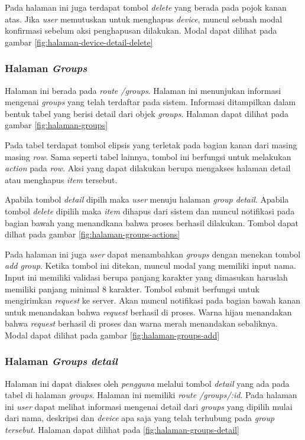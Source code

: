 Pada halaman ini juga terdapat tombol \textit{delete} yang berada pada pojok kanan atas. Jika \textit{user} memutuskan untuk menghapus \textit{device}, muncul sebuah modal konfirmasi sebelum aksi penghapusan dilakukan. Modal dapat dilihat pada gambar \ref{fig:halaman-device-detail-delete}

\subsubsection{Halaman \textit{Groups}}
Halaman ini berada pada \textit{route /groups}. Halaman ini menunjukan informasi mengenai \textit{groups} yang telah terdaftar pada sistem. Informasi ditampilkan dalam bentuk tabel yang berisi detail dari objek \textit{groups}. Halaman dapat dilihat pada gambar \ref{fig:halaman-groups}

Pada tabel terdapat tombol elipsis yang terletak pada bagian kanan dari masing masing \textit{row}. Sama seperti tabel lainnya, tombol ini berfungsi untuk melakukan \textit{action} pada \textit{row}. Aksi yang dapat dilakukan berupa mengakses halaman detail atau menghapus \textit{item} tersebut.

Apabila tombol \textit{detail} dipilh maka \textit{user} menuju halaman \textit{group detail}. Apabila tombol \textit{delete} dipilih maka \textit{item} dihapus dari sistem dan muncul notifikasi pada bagian bawah yang menandkana bahwa proses berhasil dilakukan. Tombol dapat dilhat pada gambar \ref{fig:halaman-groups-actions}

Pada halaman ini juga \textit{user} dapat menambahkan \textit{groups} dengan menekan tombol \textit{add group}. Ketika tombol ini ditekan, muncul modal yang memiliki input nama. Input ini memiliki validasi berupa panjang karakter yang dimasukan haruslah memiliki panjang minimal 8 karakter. Tombol submit berfungsi untuk mengirimkan \textit{request} ke server. Akan muncul notifikasi pada bagian bawah kanan untuk menandakan bahwa \textit{request} berhasil di proses. Warna hijau menandakan bahwa \textit{request} berhasil di proses dan warna merah menandakan sebaliknya. Modal dapat dilihat pada gambar \ref{fig:halaman-groups-add}

\subsubsection{Halaman \textit{Groups detail}}
Halaman ini dapat diakses oleh \textit{pengguna} melalui tombol \textit{detail} yang ada pada tabel di halaman \textit{groups}. Halaman ini memiliki \textit{route /groups/:id}. Pada halaman ini \textit{user} dapat melihat informasi mengenai detail dari \textit{groups} yang dipilih mulai dari nama, deskripsi dan \textit{device} apa saja yang telah terhubung pada \textit{group tersebut}. Halaman dapat dilihat pada \ref{fig:halaman-groups-detail}

